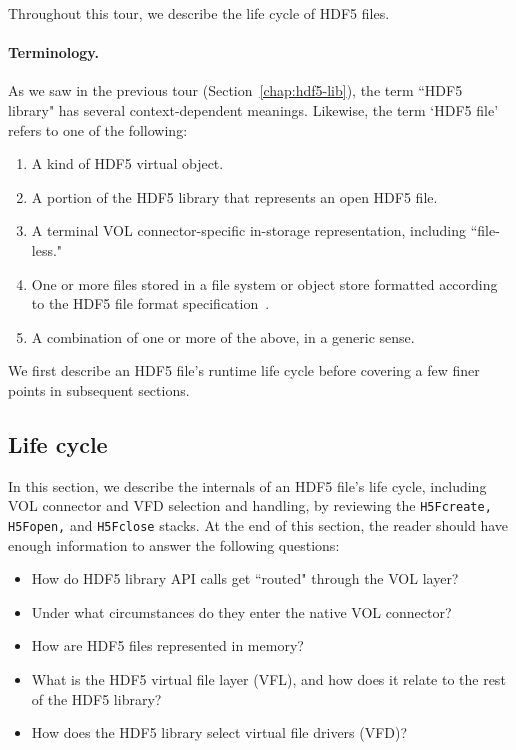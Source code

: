 


Throughout this tour, we describe the life cycle of HDF5 files.

\paragraph{Terminology.} As we saw in the previous tour (Section~\ref{chap:hdf5-lib}), the term ``HDF5 library" has several context-dependent meanings. Likewise, the term `HDF5 file' refers to one of the following:

\begin{enumerate}
    \item A kind of HDF5 virtual object.
    \item A portion of the HDF5 library that represents an open HDF5 file.
    \item A terminal VOL connector-specific in-storage representation, including ``file-less."
    \item One or more files stored in a file system or object store formatted according to the HDF5 file format specification~\cite{ffmt}.
    \item A combination of one or more of the above, in a generic sense.
\end{enumerate}

We first describe an HDF5 file’s runtime life cycle before covering a few finer points in subsequent sections.

\subsection{Life cycle}

In this section, we describe the internals of an HDF5 file's life cycle, including VOL connector and VFD selection and handling, by reviewing the \texttt{H5Fcreate, H5Fopen,} and \texttt{H5Fclose} stacks. At the end of this section, the reader should have enough information to answer the following questions:

\begin{itemize}
    \item How do HDF5 library API calls get ``routed" through the VOL layer?
    \item Under what circumstances do they enter the native VOL connector?
    \item How are HDF5 files represented in memory?
    \item What is the HDF5 virtual file layer (VFL), and how does it relate to the rest of the HDF5 library?
    \item How does the HDF5 library select virtual file drivers (VFD)?
\end{itemize}


